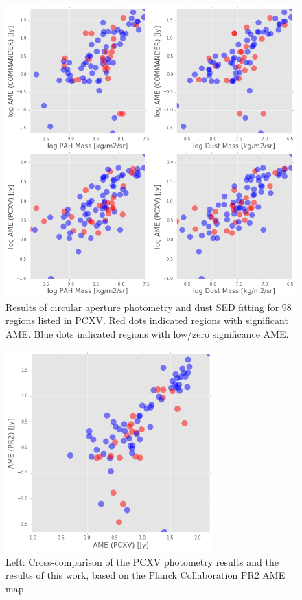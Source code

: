 \documentclass[preprint2,longabstract]{aastex}
\begin{document}
\begin{figure}
\label{fig:AME_regs_J13}
\includegraphics[width=150mm]{../Plots/AMEvsDust_regs_J13.png}
\centering
\caption{Results of circular aperture photometry and dust SED fitting for 98 regions listed in PCXV. Red dots indicated regions with significant AME. Blue dots indicated regions with low/zero significance AME. }
\end{figure}

\begin{figure}
\label{fig:AME_PCXVvsPR2}
\includegraphics[width=80mm]{../Plots/PCXVvsPR2.png}
\centering
\caption[width=75mm]{Left: Cross-comparison of the PCXV photometry results and the results of this work, based on the Planck Collaboration PR2 AME map.}
\end{figure}
\end{document}
